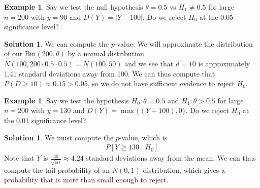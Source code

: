 \documentclass[11pt]{amsart}
\theoremstyle{definition}
\newtheorem{example}[theorem]{Example}
\newtheorem{solution}[theorem]{Solution}
\numberwithin{equation}{section}
\begin{document}
\begin{example}
    Say we test the null hypothesis $\theta=0.5$ vs $H_1\ne0.5$ for large $n=200$ with $y=90$ and $D(Y)=|Y-100|$. Do we reject $H_0$ at the 0.05 significance level?
\end{example}
\addtocounter{theorem}{-1}
\begin{solution}
    We can compute the $p$-value. We will approximate the distribution of our $\mathrm{Bin}(200,\theta)$ by a normal distribution $N(100,200\cdot 0.5\cdot 0.5)=N(100,50)$ and we see that $d=10$ is approximately 1.41 standard deviations away from 100. We can thus compute that $P(D\ge 10)\approx0.15>0.05$, so we do not have sufficient evidence to reject $H_0$.
\end{solution}
\begin{example}
    Say we test the hypothesis $H_0:\theta=0.5$ and $H_1:\theta>0.5$ for large $n=200$ with $y=130$ and $D(Y)=\max\{(Y-100),0\}$. Do we reject $H_0$ at the 0.01 significance level?
\end{example}
\addtocounter{theorem}{-1}
\begin{solution}
    We must compute the $p$-value, which is 
    \begin{align*}
        P[Y\ge 130\mid H_0]
    \end{align*}
    Note that $Y$ is $\frac{30}{\sqrt{50}}\approx4.24$ standard deviations away from the mean. We can thus compute the tail probability of an $N(0,1)$ distribution, which gives a probability that is more than small enough to reject.
\end{solution}
\end{document}
